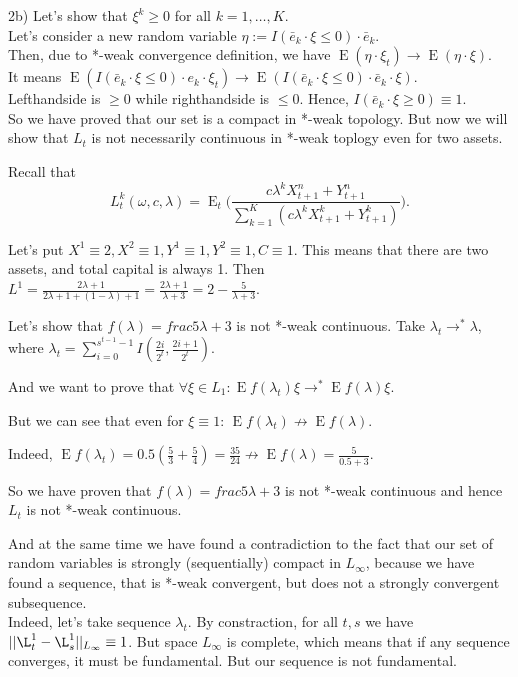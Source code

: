 \documentclass[a4paper,11pt,english]{article}
\theoremstyle{definition}
\DeclareMathOperator{\E}{E}
\begin{document}
 2b) Let's show that $\xi^k \geq 0$ for all $k=1,\dots,K$.\\
 Let's consider a new random variable 
 $\eta:=I\left(\bar e_k \cdot \xi \leq 0\right) \cdot \bar e_k$.\\

 Then, due to *-weak convergence definition, 
 we have $\E\left(\eta \cdot \xi_t \right) \to \E\left( \eta \cdot \xi\right)$.\\
 It means 
 $\E \left( I \left( \bar e_k \cdot \xi \leq 0 \right) \cdot e_k \cdot \xi_t \right) \to
 \E\left( I\left( \bar e_k \cdot \xi \leq 0 \right) \cdot \bar e_k \cdot \xi \right)$.\\

Lefthandside is $\geq 0$ while righthandside is $\leq 0$.
Hence, $I\left(\bar e_k \cdot \xi \geq 0\right) \equiv 1$.\\

So we have proved that our set is a compact in *-weak topology. 
But now we will show that $L_t$ is not necessarily continuous in *-weak toplogy even for two assets.

Recall that 
\[
L_t^k(\omega,c,\lambda) = \E_t\biggl(\frac{c\lambda^k
X_{t+1}^n + Y_{t+1}^n}{\sum_{k=1}^K (c \lambda^k X_{t+1}^k + Y_{t+1}^k)}\biggr).
\]

Let's put $X^1 \equiv 2, X^2 \equiv 1, Y^1\equiv 1, Y^2 \equiv 1, C\equiv 1$. 
This means that there are two assets, and total capital is always 1.
Then $L^1 = \frac{2\lambda + 1}{2\lambda + 1 +(1-\lambda) + 1} 
=\frac{2\lambda +1 }{\lambda +3 } = 2-\frac{5}{\lambda + 3}$.

Let's show that $f(\lambda) =frac{5}{\lambda + 3}$ is not *-weak continuous.
Take $\lambda_t \to^{*} \lambda$, where $\lambda_t =
\sum_{i=0}^{s^{t-1}-1} I\left( \frac{2i}{2^t},  \frac{2i+1}{2^t}\right)$.

And we want to prove that $\forall \xi \in L_1: \E f(\lambda_t)\xi \to^{*} \E f(\lambda)\xi$.

But we can see that even for $\xi \equiv 1$: $ \E f(\lambda_t) \not\to \E f(\lambda)$.

Indeed, $\E f(\lambda_t) = 0.5( \frac{5}{3} +\frac{5}{4}) = \frac{35}{24} \not\to \E f(\lambda)=\frac{5}{0.5+3}$.

So we have proven that $f(\lambda) =frac{5}{\lambda + 3}$ is not *-weak continuous and hence $L_t$ is not *-weak continuous.

And at the same time we have found a contradiction to 
the fact that our set of random variables is strongly (sequentially) compact in $L_{\infty}$, 
because we have found a sequence, that is *-weak convergent, but does not a strongly convergent subsequence.\\
Indeed, let's take sequence $\lambda_t$. By constraction, for all $t,s$ 
we have $|| \L^1_t - \L^1_s ||_{L_{\infty}} \equiv 1$. 
But space $L_{\infty}$ is complete, which means that if any sequence converges, it must be fundamental.
But our sequence is not fundamental.
\end{document}
